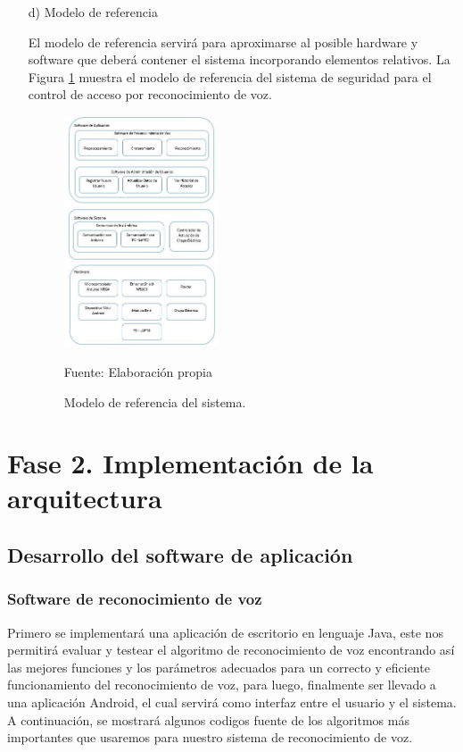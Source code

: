 \begin{enumerate}
\item[d)]Modelo de referencia
\par
El modelo de referencia servirá para aproximarse al posible hardware y software que deberá contener el sistema incorporando elementos relativos. La Figura \ref{fig:figura3.3} muestra el modelo de referencia del sistema de seguridad para el control de acceso por reconocimiento de voz.
\begin{figure}[H]
\captionsetup{justification=centering}
\begin{center}
\includegraphics[width=0.43\textwidth]{Imagenes/Cap3/image003}
\end{center}
\begin{center}
\vskip -0.5cm
\caption{\small{Modelo de referencia del sistema.}}
\label{fig:figura3.3}
{\small{Fuente: Elaboración propia}}
\end{center}
\end{figure}
\end{enumerate}

\section{Fase 2. Implementación de la arquitectura}
\subsection{Desarrollo del software de aplicación}
\subsubsection{Software de reconocimiento de voz}
Primero se implementará una aplicación de escritorio en lenguaje Java, este nos permitirá evaluar y testear el algoritmo de reconocimiento de voz encontrando así las mejores funciones y los parámetros adecuados para un correcto y eficiente funcionamiento del reconocimiento de voz, para luego, finalmente ser llevado a una aplicación Android, el cual servirá como interfaz entre el usuario y el sistema. A continuación, se mostrará algunos codigos fuente de los algoritmos más importantes que usaremos para nuestro sistema de reconocimiento de voz.

